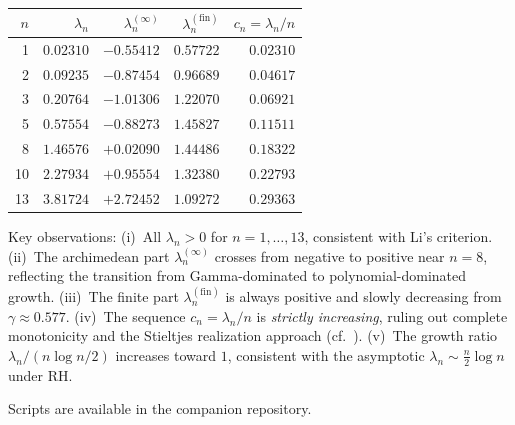 \documentclass[12pt,a4paper]{article}
\theoremstyle{definition}
\theoremstyle{remark}
\begin{document}
\medskip
\begin{center}
\begin{tabular}{r|r|r|r|r}
$n$ & $\lambda_n$ & $\lambda_n^{(\infty)}$ & $\lambda_n^{(\mathrm{fin})}$ & $c_n = \lambda_n/n$ \\
\hline
1 & $0.02310$ & $-0.55412$ & $0.57722$ & $0.02310$ \\
2 & $0.09235$ & $-0.87454$ & $0.96689$ & $0.04617$ \\
3 & $0.20764$ & $-1.01306$ & $1.22070$ & $0.06921$ \\
5 & $0.57554$ & $-0.88273$ & $1.45827$ & $0.11511$ \\
8 & $1.46576$ & $+0.02090$ & $1.44486$ & $0.18322$ \\
10 & $2.27934$ & $+0.95554$ & $1.32380$ & $0.22793$ \\
13 & $3.81724$ & $+2.72452$ & $1.09272$ & $0.29363$ \\
\end{tabular}
\end{center}

\medskip\noindent
Key observations: (i)~All $\lambda_n > 0$ for $n = 1, \ldots, 13$, consistent with Li's criterion. (ii)~The archimedean part $\lambda_n^{(\infty)}$ crosses from negative to positive near $n = 8$, reflecting the transition from Gamma-dominated to polynomial-dominated growth. (iii)~The finite part $\lambda_n^{(\mathrm{fin})}$ is always positive and slowly decreasing from $\gamma \approx 0.577$. (iv)~The sequence $c_n = \lambda_n/n$ is \emph{strictly increasing}, ruling out complete monotonicity and the Stieltjes realization approach (cf.\ ). (v)~The growth ratio $\lambda_n/(n\log n/2)$ increases toward $1$, consistent with the asymptotic $\lambda_n \sim \frac{n}{2}\log n$ under RH.

Scripts are available in the companion repository.



\end{document}
